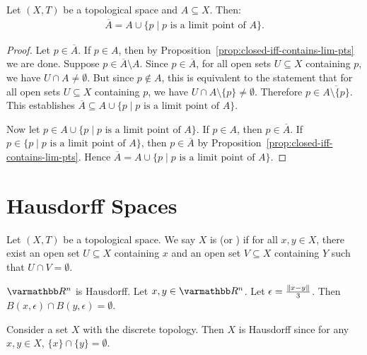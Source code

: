 \begin{proposition}
    Let $(X,T)$ be a topological space and $A \subseteq X$. Then:
        \begin{equation*}
        \begin{split}
            \overline{A} = A \cup \{p \mid p \text{ is a limit point of $A$}\}.
        \end{split}
        \end{equation*}
\end{proposition}
    \begin{proof}
        Let $p \in \overline{A}$. If $p \in A$, then by Proposition~\ref{prop:closed-iff-contains-lim-pts} we are done. Suppose $p \in \overline{A} \setminus A$. Since $p \in \overline{A}$, for all open sets $U \subseteq X$ containing $p$, we have $U \cap A \neq \emptyset$. But since $p \not\in A$, this is equivalent to the statement that for all open sets $U \subseteq X$ containing $p$, we have $U \cap A\setminus\{p\} \neq \emptyset$. Therefore $p \in \overline{A \setminus \{p\}}$. This establishes $\overline{A} \subseteq A \cup \{p \mid p \text{ is a limit point of }A\}$.

        Now let $p \in A \cup \{p \mid p \text{ is a limit point of $A$}\}$. If $p \in A$, then $p \in \overline{A}$. If $p \in \{p \mid p \text{ is a limit point of $A$}\}$, then $p \in \overline{A}$ by Proposition~\ref{prop:closed-iff-contains-lim-pts}. Hence $\overline{A} = A \cup \{p \mid p \text{ is a limit point of $A$}\}$.
    \end{proof}

\section{Hausdorff Spaces}

\begin{definition}
    Let $(X,T)$ be a topological space. We say $X$ is  (or ) if for all $x,y \in X$, there exist an open set $U \subseteq X$ containing $x$ and an open set $V \subseteq X$ containing $Y$ such that $U \cap V = \emptyset$.
\end{definition}

\begin{example}
    $\bfR^n$ is Hausdorff. Let $x,y \in \bfR^n$. Let $\epsilon = \frac{\left\lVert x-y \right\rVert}{3}$. Then $B(x,\epsilon) \cap B(y,\epsilon) = \emptyset$.
\end{example}

\begin{example}
    Consider a set $X$ with the discrete topology. Then $X$ is Hausdorff since for any $x,y \in X$, $\{x\} \cap \{y\} = \emptyset$.
\end{example}

